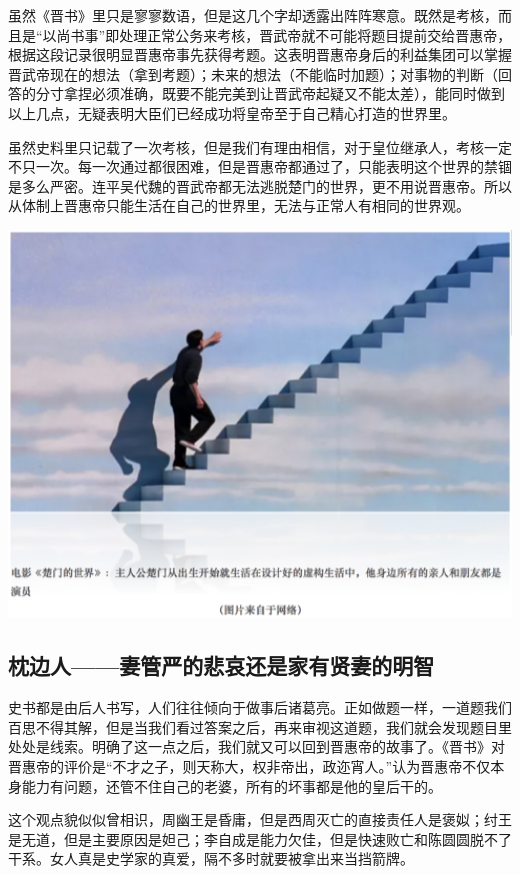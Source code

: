 \documentclass[]{book}
\begin{document}
虽然《晋书》里只是寥寥数语，但是这几个字却透露出阵阵寒意。既然是考核，而且是``以尚书事''即处理正常公务来考核，晋武帝就不可能将题目提前交给晋惠帝，根据这段记录很明显晋惠帝事先获得考题。这表明晋惠帝身后的利益集团可以掌握晋武帝现在的想法（拿到考题）；未来的想法（不能临时加题）；对事物的判断（回答的分寸拿捏必须准确，既要不能完美到让晋武帝起疑又不能太差），能同时做到以上几点，无疑表明大臣们已经成功将皇帝至于自己精心打造的世界里。

虽然史料里只记载了一次考核，但是我们有理由相信，对于皇位继承人，考核一定不只一次。每一次通过都很困难，但是晋惠帝都通过了，只能表明这个世界的禁锢是多么严密。连平吴代魏的晋武帝都无法逃脱楚门的世界，更不用说晋惠帝。所以从体制上晋惠帝只能生活在自己的世界里，无法与正常人有相同的世界观。

\includegraphics[width=6.67in]{images/his6}

\subsection{枕边人------妻管严的悲哀还是家有贤妻的明智}

史书都是由后人书写，人们往往倾向于做事后诸葛亮。正如做题一样，一道题我们百思不得其解，但是当我们看过答案之后，再来审视这道题，我们就会发现题目里处处是线索。明确了这一点之后，我们就又可以回到晋惠帝的故事了。《晋书》对晋惠帝的评价是``不才之子，则天称大，权非帝出，政迩宵人。''认为晋惠帝不仅本身能力有问题，还管不住自己的老婆，所有的坏事都是他的皇后干的。

这个观点貌似似曾相识，周幽王是昏庸，但是西周灭亡的直接责任人是褒姒；纣王是无道，但是主要原因是妲己；李自成是能力欠佳，但是快速败亡和陈圆圆脱不了干系。女人真是史学家的真爱，隔不多时就要被拿出来当挡箭牌。
\end{document}

